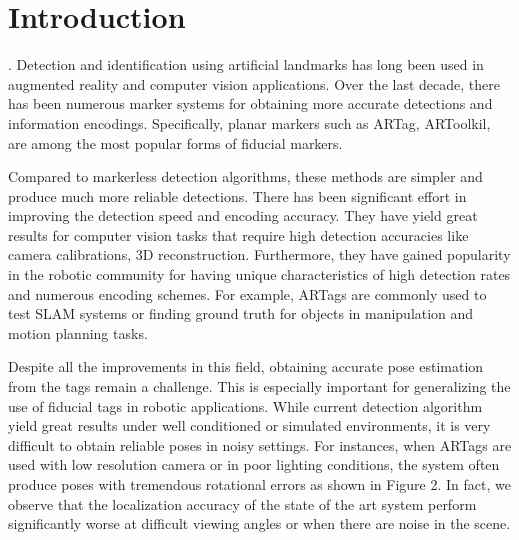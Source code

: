 \section{Introduction}
\label{sec:intro}
.
Detection and identification using artificial landmarks has long been used in augmented reality and computer vision applications. Over the last decade, there has been numerous marker systems for obtaining more accurate detections and information encodings. Specifically, planar markers such as ARTag, ARToolkil, are among the most popular forms of fiducial markers.

Compared to markerless detection algorithms, these methods are simpler and produce much more reliable detections. There has been significant effort in improving the detection speed and encoding accuracy. They have yield great results for computer vision tasks that require high detection accuracies like camera calibrations, 3D reconstruction. Furthermore, they have gained popularity in the robotic community for having unique characteristics of high detection rates and numerous encoding schemes. For example, ARTags are commonly used to test SLAM systems or finding ground truth for objects in manipulation and motion planning tasks. 

Despite all the improvements in this field, obtaining accurate pose estimation from the tags remain a challenge. This is especially important for generalizing the use of fiducial tags in robotic applications. While current detection algorithm yield great results under well conditioned or simulated environments, it is very difficult to obtain reliable poses in noisy settings. For instances, when ARTags are used with low resolution camera or in poor lighting conditions, the system often produce poses with tremendous rotational errors as shown in Figure 2.  In fact, we observe that the localization accuracy of the state of the art system perform significantly worse at difficult viewing angles or when there are noise in the scene. 

